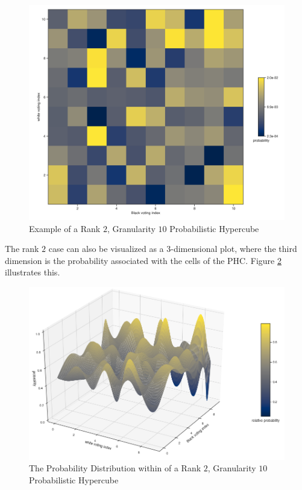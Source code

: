 \begin{figure}[ht]\centering
 \includegraphics[width=\linewidth]{figures/2d_phc_plot_example.png}
 \caption{Example of a Rank $2$, Granularity $10$ Probabilistic Hypercube}
 \label{fig:2d_phc_plot_example}
\end{figure}

The rank $2$ case can also be visualized as a $3$-dimensional plot, where the third dimension is the probability associated with the cells of the PHC. Figure \ref{fig:2d_phc_plot_dist_example} illustrates this.

\begin{figure}[ht]\centering
 \includegraphics[width=\linewidth]{figures/2d_phc_plot_dist_example.png}
 \caption{The Probability Distribution within of a Rank $2$, Granularity $10$ Probabilistic Hypercube}
 \label{fig:2d_phc_plot_dist_example}
\end{figure}

